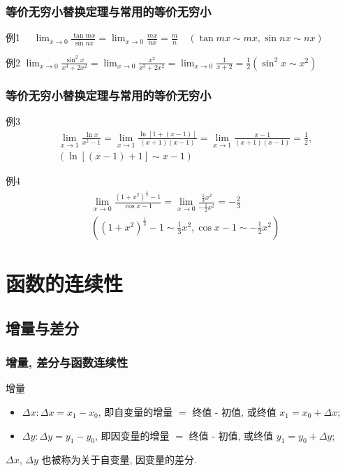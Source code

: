 \documentclass[
10pt, 
aspectratio=43, 
]{beamer}
\begin{document}
\begin{frame}
\frametitle{等价无穷小替换定理与常用的等价无穷小}
\begin{exampleblock}{例1}
 $ \quad \lim _{x \rightarrow 0} \frac{\tan m x}{\sin n x}=\lim _{x \rightarrow 0} \frac{m x}{n x}=\frac{m}{n} \quad(\tan m x \sim m x,  \sin n x\sim n x)$
\end{exampleblock}
\pause
\begin{exampleblock}{例2}
 $ \lim _{x \rightarrow 0} \frac{\sin ^2 x}{x^3+2 x^2}=\lim _{x \rightarrow 0} \frac{x^2}{x^3+2 x^2}=\lim _{x \rightarrow 0} \frac{1}{x+2}=\frac{1}{2}\left(\sin ^2 x \sim x^2\right)$
\end{exampleblock}
\end{frame}
\begin{frame}
\frametitle{等价无穷小替换定理与常用的等价无穷小}
\begin{exampleblock}{例3}
\begin{equation*}
\begin{aligned}
&\lim _{x \rightarrow 1} \frac{\ln x}{x^2-1}=\lim _{x \rightarrow 1} \frac{\ln [1+(x-1)]}{(x+1)(x-1)}=\lim _{x \rightarrow 1} \frac{x-1}{(x+1)(x-1)}=\frac{1}{2}, \\
&(\ln [(x-1)+1] \sim x-1)
\end{aligned}
\end{equation*}
\end{exampleblock}
\pause
\begin{exampleblock}{例4} \begin{equation*}
\begin{aligned}
& \lim _{x \rightarrow 0} \frac{\left(1+x^2\right)^{\frac{1}{3}}-1}{\cos x-1}=\lim _{x \rightarrow 0} \frac{\frac{1}{3} x^2}{-\frac{1}{2} x^2}= -\frac{2}{3}\\
& \left(\left(1+x^2\right)^{\frac{1}{3}}-1 \sim \frac{1}{3} x^2,  \cos x-1 \sim-\frac{1}{2} x^2\right)
\end{aligned}
\end{equation*}
\end{exampleblock}
\end{frame}

\section{函数的连续性}
\subsection{增量与差分}

\begin{frame}
\frametitle{增量,  差分与函数连续性}
\begin{block}{增量}
\begin{itemize}
    \item $\Delta x:  \Delta x=x_1-x_0$,  即自变量的增量 $=$ 终值 - 初值,  或终值 $x_1=x_0+\Delta x$;
    \item $\Delta y:  \Delta y=y_1-y_0$,  即因变量的增量 $=$ 终值 - 初值,  或终值 $y_1=y_0+\Delta y$;
\end{itemize}
$\Delta x$,  $\Delta y$ 也被称为关于自变量, 因变量的差分.
\end{block}
\end{frame}
\end{document}
